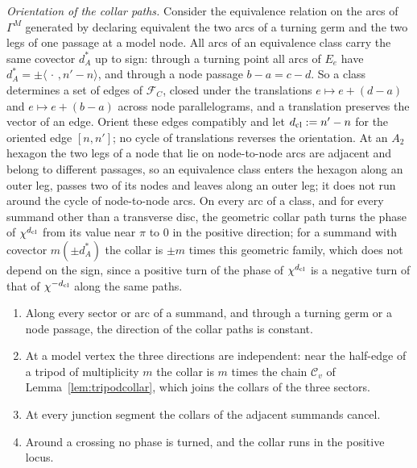 \emph{Orientation of the collar paths.} Consider the equivalence relation on the arcs of $\Gamma^M$ generated by
declaring equivalent the two arcs of a turning germ and the two legs of one passage at a model node. All arcs of an
equivalence class carry the same covector $d^*_A$ up to sign: through a turning point all arcs of $E_e$ have
$d^*_A=\pm\langle\,\cdot\,,n'-n\rangle$, and through a node passage $b-a=c-d$. So a class determines a set of edges of
$\mathcal F_C$, closed under the translations $e\mapsto e+(d-a)$ and $e\mapsto e+(b-a)$ across node parallelograms, and a
translation preserves the vector of an edge. Orient these edges compatibly and let $d_{\rm cl}:=n'-n$ for the oriented
edge $[n,n']$; no cycle of translations reverses the orientation. At an $A_2$ hexagon the two legs of a node that lie on
node-to-node arcs are adjacent and belong to different passages, so an equivalence class enters the hexagon along an outer
leg, passes two of its nodes and leaves along an outer leg; it does not run around the cycle of node-to-node arcs. On
every arc of a class, and for every summand other than a transverse disc, the geometric collar path turns the phase of
$\chi^{d_{\rm cl}}$ from its value near $\pi$ to $0$ in the positive direction; for a summand with covector $m(\pm d^*_A)$
the collar is $\pm m$ times this geometric family, which does not depend on the sign, since a positive turn of the phase of
$\chi^{d_{\rm cl}}$ is a negative turn of that of $\chi^{-d_{\rm cl}}$ along the same paths.

\begin{lemma}\label{lem:collarB}
\begin{enumerate}
\item Along every sector or arc of a summand, and through a turning germ or a node passage, the direction of the collar
paths is constant.
\item At a model vertex the three directions are independent: near the half-edge of a tripod of multiplicity $m$ the
collar is $m$ times the chain $\mathscr C_v$ of Lemma~\ref{lem:tripodcollar}, which joins the collars of the three
sectors.
\item At every junction segment the collars of the adjacent summands cancel.
\item Around a crossing no phase is turned, and the collar runs in the positive locus.
\end{enumerate}
\end{lemma}

